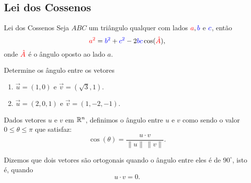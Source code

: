 \subsection*{Lei dos Cossenos}
\begin{frame}[label=vetores2]


	\begin{exampleblock}{Lei dos Cossenos}
	Seja $ABC$ um triângulo qualquer com lados ${\color{red}a}, {\color{blue}b}$ e ${\color{blue}c}$, então
	\[{\color{red}a^2}={\color{blue}b^2}+{\color{blue}c^2}-2{\color{blue}b c}\cos( {\color{red}\hat{A}}),\]
	onde ${\color{red}\hat{A}}$ é o ângulo oposto ao lado $a$. 
	
	\begin{center}
	\end{center}
\end{exampleblock}
\end{frame}



\begin{frame}[label=vetores2]
\begin{exe}
Determine os ângulo entre os vetores
\begin{enumerate}
\item $\vec{u}=(1,0)$ e $\vec{v}=(\sqrt{3},1)$.

\item $\vec{u}=(2,0,1)$ e $\vec{v}=(1,-2,-1)$.
\end{enumerate}
\end{exe}

\begin{defin}
Dados vetores $u$ e $v$ em $\mathbb{R}^n$, definimos o {\color{blue}ângulo entre $u$ e $v$} como sendo o valor $0\leq \theta\leq \pi$ que satisfaz:
\[\cos(\theta)=\frac{u\cdot v}{\|u\|\, \|v\|}. \] 
\end{defin}

Dizemos que dois vetores são {\color{blue}ortogonais} quando o ângulo entre eles é de $90^\circ$, isto é, quando 
\[u\cdot v=0.\]
\end{frame}


